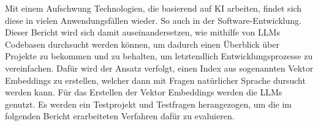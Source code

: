 \documentclass[../main.tex]{subfiles}
\begin{document}
Mit einem Aufschwung Technologien, die basierend auf \gls{KI} arbeiten, findet sich diese in vielen Anwendungsfällen wieder.
So auch in der Software-Entwicklung.
Dieser Bericht wird sich damit auseinandersetzen, wie mithilfe von \glspl{LLM} Codebasen durchsucht werden können, um dadurch einen Überblick über Projekte zu bekommen und zu behalten, um letztendlich Entwicklungsprozesse zu vereinfachen.
Dafür wird der Ansatz verfolgt, einen Index aus sogenannten Vektor Embeddings zu erstellen, welcher dann mit Fragen natürlicher Sprache dursucht werden kann.
Für das Erstellen der Vektor Embeddings werden die \glspl{LLM} genutzt.
Es werden ein Testprojekt und Testfragen herangezogen, um die im folgenden Bericht erarbeiteten Verfahren dafür zu evaluieren.
\end{document}
